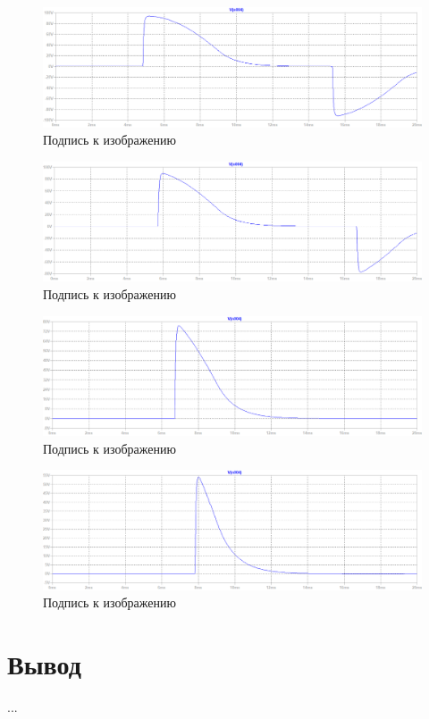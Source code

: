 \documentclass[a4paper, 12pt]{article}
\begin{document}
    \begin{figure}[H]
        \centering
        \includegraphics[scale=0.45]{R2-160k_C10u.png}
        \captionsetup{skip=0pt}
        \caption{Подпись к изображению}
        \label{fig:R2-160k_C10u}
    \end{figure}
    \begin{figure}[H]
        \centering
        \includegraphics[scale=0.45]{R2-210k_C10u.png}
        \captionsetup{skip=0pt}
        \caption{Подпись к изображению}
        \label{fig:R2-210k_C10u}
    \end{figure}
    \begin{figure}[H]
        \centering
        \includegraphics[scale=0.45]{R2-260k_C10u.png}
        \captionsetup{skip=0pt}
        \caption{Подпись к изображению}
        \label{fig:R2-260k_C10u}
    \end{figure}
    \begin{figure}[H]
        \centering
        \includegraphics[scale=0.45]{R2-300k_C10u.png}
        \captionsetup{skip=0pt}
        \caption{Подпись к изображению}
        \label{fig:R2-300k_C10u}
    \end{figure}


    \section{Вывод}
    ...
\end{document}
